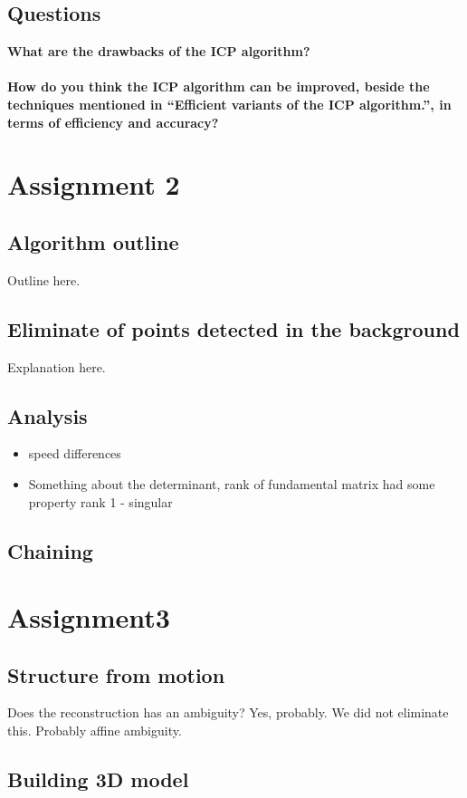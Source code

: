 \documentclass[12pt]{amsart}
\begin{document}
\subsection{Questions}
\textbf{What are the drawbacks of the ICP algorithm?}\\\\
\textbf{How do you think the ICP algorithm can be improved, beside the techniques mentioned in ``Efficient variants of the ICP algorithm.'', in terms of efficiency and accuracy?}

\section{Assignment 2}
\subsection{Algorithm outline}
Outline here.
\subsection{Eliminate of points detected in the background}
Explanation here.
\subsection{Analysis}
\begin{itemize}
\item speed differences
\item Something about the determinant, rank of fundamental matrix had some property rank 1 - singular
\end{itemize}
\subsection{Chaining}
\section{Assignment3}
\subsection{Structure from motion}
Does the reconstruction has an ambiguity? Yes, probably. We did not eliminate this. Probably affine ambiguity. 
\subsection{Building 3D model}
\end{document}
